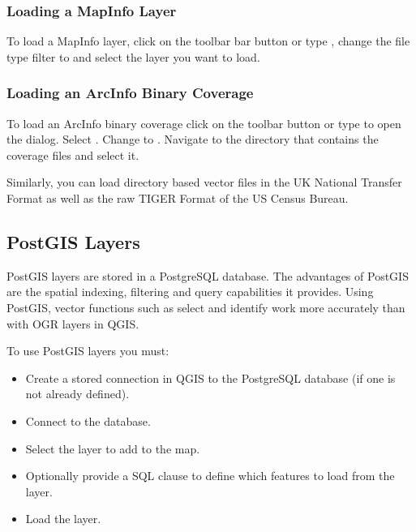\subsubsection{Loading a MapInfo Layer}

To load a MapInfo layer, click on the 
toolbar bar button or type , change the file type filter to
 and select the layer you want to load.

\subsubsection{Loading an ArcInfo Binary Coverage}

To load an ArcInfo binary coverage click on the 
toolbar button or type  to open the 
 dialog.  Select . Change to . 
Navigate to the directory that contains the coverage files and select it.

Similarly, you can load directory based  vector files in the UK National Transfer Format as well as the 
raw TIGER Format of the US Census Bureau.

\subsection{PostGIS Layers}
\label{label_postgis} 

PostGIS layers are stored in a PostgreSQL database. The advantages of PostGIS
are the spatial indexing, filtering and query capabilities it provides. Using PostGIS,
vector functions such as select and identify work more accurately than with
OGR layers in QGIS.

To use PostGIS layers you must:

\begin{itemize}
\item Create a stored connection in QGIS to the PostgreSQL database (if one is
not already defined).
\item Connect to the database.
\item Select the layer to add to the map.
\item Optionally provide a SQL 
clause to define which features
to load from the layer.
\item Load the layer.
\end{itemize}

